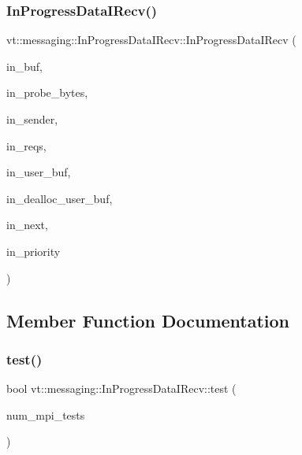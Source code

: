 \subsubsection{\texorpdfstring{In\+Progress\+Data\+I\+Recv()}{InProgressDataIRecv()}}
{\footnotesize\ttfamily vt\+::messaging\+::\+In\+Progress\+Data\+I\+Recv\+::\+In\+Progress\+Data\+I\+Recv (\begin{DoxyParamCaption}\item[{char $\ast$}]{in\+\_\+buf,  }\item[{\hyperlink{namespacevt_a408e86a8c7c89309b52907dc5a513924}{Msg\+Size\+Type}}]{in\+\_\+probe\+\_\+bytes,  }\item[{\hyperlink{namespacevt_a866da9d0efc19c0a1ce79e9e492f47e2}{Node\+Type}}]{in\+\_\+sender,  }\item[{std\+::vector$<$ M\+P\+I\+\_\+\+Request $>$}]{in\+\_\+reqs,  }\item[{void $\ast$const}]{in\+\_\+user\+\_\+buf,  }\item[{\hyperlink{namespacevt_ae0a5a7b18cc99d7b732cb4d44f46b0f3}{Action\+Type}}]{in\+\_\+dealloc\+\_\+user\+\_\+buf,  }\item[{\hyperlink{namespacevt_a6de3bd201e2a040be9362d9d24d1e446}{Continuation\+Deleter\+Type}}]{in\+\_\+next,  }\item[{\hyperlink{namespacevt_a86bff9f556eb761b27fc8600d006ac04}{Priority\+Type}}]{in\+\_\+priority }\end{DoxyParamCaption})\hspace{0.3cm}{\ttfamily [inline]}}



\subsection{Member Function Documentation}
\mbox{\label{structvt_1_1messaging_1_1_in_progress_data_i_recv_a5d7e51732503e70a684f27a8c2985dc9}} 
\subsubsection{\texorpdfstring{test()}{test()}}
{\footnotesize\ttfamily bool vt\+::messaging\+::\+In\+Progress\+Data\+I\+Recv\+::test (\begin{DoxyParamCaption}\item[{int \&}]{num\+\_\+mpi\+\_\+tests }\end{DoxyParamCaption})\hspace{0.3cm}{\ttfamily [inline]}}



